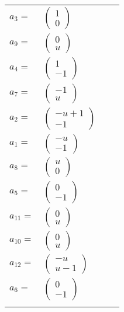 \documentclass[1p]{elsarticle_modified}
\theoremstyle{definition}
\begin{document}
\begin{tabular}{m{7pt} m{180pt} m{7pt} m{180pt} }
\flushright $a_{3}=$&$\begin{pmatrix}1\\0\end{pmatrix}$ \\
\flushright $a_{9}=$&$\begin{pmatrix}0\\u\end{pmatrix}$ \\
\flushright $a_{4}=$&$\begin{pmatrix}1\\-1\end{pmatrix}$ \\
\flushright $a_{7}=$&$\begin{pmatrix}-1\\u\end{pmatrix}$ \\
\flushright $a_{2}=$&$\begin{pmatrix}- u+1\\-1\end{pmatrix}$ \\
\flushright $a_{1}=$&$\begin{pmatrix}- u\\-1\end{pmatrix}$ \\
\flushright $a_{8}=$&$\begin{pmatrix}u\\0\end{pmatrix}$ \\
\flushright $a_{5}=$&$\begin{pmatrix}0\\-1\end{pmatrix}$ \\
\flushright $a_{11}=$&$\begin{pmatrix}0\\u\end{pmatrix}$ \\
\flushright $a_{10}=$&$\begin{pmatrix}0\\u\end{pmatrix}$ \\
\flushright $a_{12}=$&$\begin{pmatrix}- u\\u-1\end{pmatrix}$ \\
\flushright $a_{6}=$&$\begin{pmatrix}0\\-1\end{pmatrix}$\\&\end{tabular}
\end{document}
